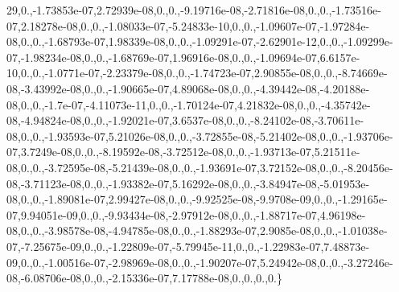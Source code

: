 \begin{DoxyCompactItemize}
29,0.,-\/1.\-73853e-\/07,2.\-72939e-\/08,0.,0.,-\/9.\-19716e-\/08,-\/2.\-71816e-\/08,0.,0.,-\/1.\-73516e-\/07,2.\-18278e-\/08,0.,0.,-\/1.\-08033e-\/07,-\/5.\-24833e-\/10,0.,0.,-\/1.\-09607e-\/07,-\/1.\-97284e-\/08,0.,0.,-\/1.\-68793e-\/07,1.\-98339e-\/08,0.,0.,-\/1.\-09291e-\/07,-\/2.\-62901e-\/12,0.,0.,-\/1.\-09299e-\/07,-\/1.\-98234e-\/08,0.,0.,-\/1.\-68769e-\/07,1.\-96916e-\/08,0.,0.,-\/1.\-09694e-\/07,6.\-6157e-\/10,0.,0.,-\/1.\-0771e-\/07,-\/2.\-23379e-\/08,0.,0.,-\/1.\-74723e-\/07,2.\-90855e-\/08,0.,0.,-\/8.\-74669e-\/08,-\/3.\-43992e-\/08,0.,0.,-\/1.\-90665e-\/07,4.\-89068e-\/08,0.,0.,-\/4.\-39442e-\/08,-\/4.\-20188e-\/08,0.,0.,-\/1.\-7e-\/07,-\/4.\-11073e-\/11,0.,0.,-\/1.\-70124e-\/07,4.\-21832e-\/08,0.,0.,-\/4.\-35742e-\/08,-\/4.\-94824e-\/08,0.,0.,-\/1.\-92021e-\/07,3.\-6537e-\/08,0.,0.,-\/8.\-24102e-\/08,-\/3.\-70611e-\/08,0.,0.,-\/1.\-93593e-\/07,5.\-21026e-\/08,0.,0.,-\/3.\-72855e-\/08,-\/5.\-21402e-\/08,0.,0.,-\/1.\-93706e-\/07,3.\-7249e-\/08,0.,0.,-\/8.\-19592e-\/08,-\/3.\-72512e-\/08,0.,0.,-\/1.\-93713e-\/07,5.\-21511e-\/08,0.,0.,-\/3.\-72595e-\/08,-\/5.\-21439e-\/08,0.,0.,-\/1.\-93691e-\/07,3.\-72152e-\/08,0.,0.,-\/8.\-20456e-\/08,-\/3.\-71123e-\/08,0.,0.,-\/1.\-93382e-\/07,5.\-16292e-\/08,0.,0.,-\/3.\-84947e-\/08,-\/5.\-01953e-\/08,0.,0.,-\/1.\-89081e-\/07,2.\-99427e-\/08,0.,0.,-\/9.\-92525e-\/08,-\/9.\-9708e-\/09,0.,0.,-\/1.\-29165e-\/07,9.\-94051e-\/09,0.,0.,-\/9.\-93434e-\/08,-\/2.\-97912e-\/08,0.,0.,-\/1.\-88717e-\/07,4.\-96198e-\/08,0.,0.,-\/3.\-98578e-\/08,-\/4.\-94785e-\/08,0.,0.,-\/1.\-88293e-\/07,2.\-9085e-\/08,0.,0.,-\/1.\-01038e-\/07,-\/7.\-25675e-\/09,0.,0.,-\/1.\-22809e-\/07,-\/5.\-79945e-\/11,0.,0.,-\/1.\-22983e-\/07,7.\-48873e-\/09,0.,0.,-\/1.\-00516e-\/07,-\/2.\-98969e-\/08,0.,0.,-\/1.\-90207e-\/07,5.\-24942e-\/08,0.,0.,-\/3.\-27246e-\/08,-\/6.\-08706e-\/08,0.,0.,-\/2.\-15336e-\/07,7.\-17788e-\/08,0.,0.,0.,0.\}

\end{DoxyCompactItemize}
